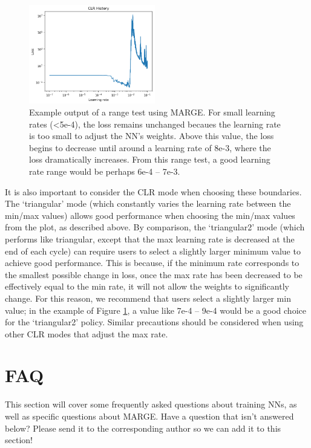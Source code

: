 \documentclass[letterpaper, 12pt]{article}
\begin{document}
\begin{figure}[h]
\centering
\includegraphics[width=0.49\textwidth, clip]{range_test.png}
\caption{Example output of a range test using MARGE.  For small learning rates 
(\textless 5e-4), the loss remains unchanged becaues the learning rate is too 
small to adjust the NN's weights.  Above this value, the loss begins to decrease
until around a learning rate of 8e-3, where the loss dramatically increases. 
From this range test, a good learning rate range would be perhaps 6e-4 -- 
7e-3.}  
\label{fig:rangetest}
\end{figure}

\noindent It is also important to consider the CLR mode when choosing these 
boundaries.  The `triangular' mode (which constantly varies the 
learning rate between the min/max values) allows good performance when choosing 
the min/max values from the plot, as described above.  By comparison, the 
`triangular2' mode (which performs like triangular, except that the max 
learning rate is decreased at the end of each cycle) can require users to 
select a slightly larger minimum value to achieve good performance.  This is 
because, if the minimum rate corresponds to the smallest possible change in 
loss, once the max rate has been decreased to be effectively equal to the min 
rate, it will not allow the weights to significantly change.  For this reason, 
we recommend that users select a slightly larger min value; in the example of 
Figure \ref{fig:rangetest}, a value like 7e-4 -- 9e-4 would be a good choice 
for the `triangular2' policy.  Similar precautions should be considered when 
using other CLR modes that adjust the max rate.


\section{FAQ}

This section will cover some frequently asked questions about training NNs, 
as well as specific questions about MARGE.  Have a question that isn't 
answered below?  Please send it to the corresponding author so we can add 
it to this section! \newline
\end{document}
